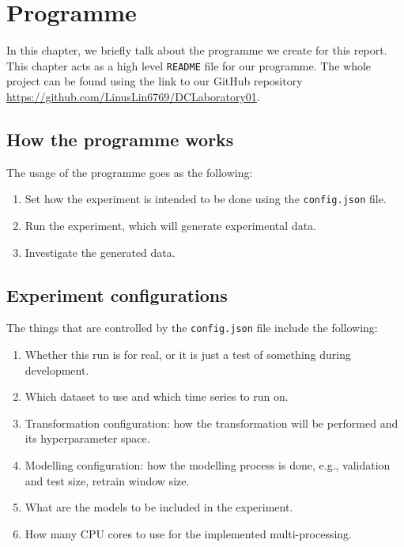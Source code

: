 \chapter{Programme}\label{apdx: programme}
In this chapter, we briefly talk about the programme we create for this report. This chapter acts as a high level \verb+README+ file for our programme. The whole project can be found using the link to our GitHub repository \url{https://github.com/LinusLin6769/DCLaboratory01}.

\section{How the programme works}
The usage of the programme goes as the following:
\begin{enumerate}
    \item Set how the experiment is intended to be done using the \verb+config.json+ file.
    \item Run the experiment, which will generate experimental data.
    \item Investigate the generated data.
\end{enumerate}

\section{Experiment configurations}
The things that are controlled by the \verb+config.json+ file include the following:
\begin{enumerate}
    \item Whether this run is for real, or it is just a test of something during development.
    \item Which dataset to use and which time series to run on.
    \item Transformation configuration: how the transformation will be performed and its hyperparameter space.
    \item Modelling configuration: how the modelling process is done, e.g., validation and test size, retrain window size.
    \item What are the models to be included in the experiment.
    \item How many CPU cores to use for the implemented multi-processing.
\end{enumerate}

